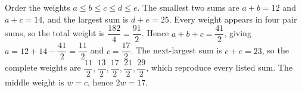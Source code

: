 Order the weights $a\le b\le c\le d\le e$. The smallest two sums are $a+b=12$ and $a+c=14$, and the largest sum is $d+e=25$. Every weight appears in four pair sums, so the total weight is $\dfrac{182}{4}=\dfrac{91}{2}$. Hence $a+b+c=\dfrac{41}{2}$, giving $a=12+14-\dfrac{41}{2}=\dfrac{11}{2}$ and $c=\dfrac{17}{2}$. The next-largest sum is $c+e=23$, so the complete weights are $\dfrac{11}{2},\dfrac{13}{2},\dfrac{17}{2},\dfrac{21}{2},\dfrac{29}{2}$, which reproduce every listed sum. The middle weight is $w=c$, hence $\boxed{2w=17}$.
